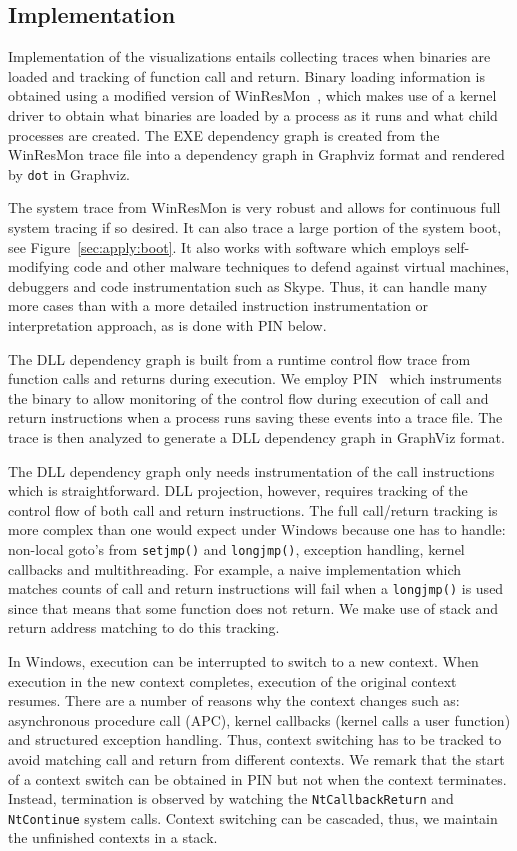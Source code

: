 \subsection{Implementation}

Implementation of the visualizations entails collecting tra\-ces when
binaries are loaded and tracking of function call and return.
Binary loading information is obtained using
a modified version of WinResMon~\cite{ramnath2006winresmon},
which makes use of a kernel driver to obtain
what binaries are loaded by a process as it runs and
what child processes are created.
The EXE dependency graph is created from
the WinResMon trace file into a dependency graph in
Graphviz \cite{ellson2002graphviz} format and rendered by {\tt dot} in Graphviz.

The system trace from WinResMon is very robust and allows for continuous
full system tracing if so desired.
It can also trace a large portion of the system boot,
see Figure~\ref{sec:apply:boot}.
It also works with software which employs self-modifying
code and other malware techniques to defend against virtual machines,
debuggers and code instrumentation such as Skype.
Thus, it can handle many more cases than with a more detailed
instruction instrumentation or interpretation approach, as is done
with PIN below.

The DLL dependency graph is built from a runtime control flow trace from
function calls and returns during execution.
We employ PIN~\cite{luk2005pin} which instruments the binary to allow monitoring
of the control flow during execution of call and return instructions
when a process runs saving these events into a trace file.
The trace is then analyzed to generate a DLL dependency graph in
GraphViz format.

The DLL dependency graph only needs instrumentation of the call instructions
which is straightforward.
DLL projection, however, requires tracking of the control flow of both
call and return instructions.
The full call/return tracking is more complex than one would expect
under Windows because one has to handle:
non-local goto's from {\tt setjmp()} and {\tt longjmp()}, exception handling,
kernel callbacks and multithreading.
For example, a naive implementation which matches counts of call and
return instructions will fail when a {\tt longjmp()} is used
since that means that some function does not return.
We make use of stack and return address matching to do this tracking.

In Windows, execution can be interrupted to switch to a new context.
When execution in the new context completes, execution of the original
context resumes.
There are a number of reasons why the context changes
such as: asynchronous procedure call (APC), kernel callbacks
(kernel calls a user function) and structured exception handling.
Thus, context switching has to be tracked to avoid matching
call and return from different contexts.
We remark that the start of a context switch can be obtained in PIN but
not when the context terminates.
Instead, termination is observed by watching the {\tt NtCallbackReturn}
and {\tt NtContinue} system calls.
Context switching can be cascaded, thus, we maintain the unfinished
contexts in a stack.

